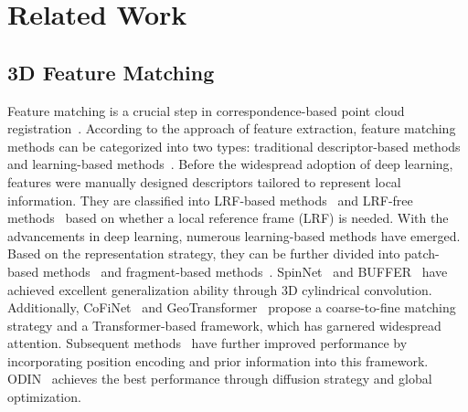 \section{Related Work}
\subsection{3D Feature Matching}
Feature matching is a crucial step in 
correspondence-based point cloud registration~\cite{FPFH,zeng20173dmatch,ao2021spinnet,huang2021predator,yu2021cofinet,qin2022geometric,yu2023peal}. 
According to the approach of feature extraction, feature matching methods 
can be categorized into two types: traditional descriptor-based methods~\cite{PFH, FPFH, salti2014shot} and 
learning-based methods~\cite{ao2021spinnet,huang2021predator,yu2021cofinet,qin2022geometric,yu2023peal}. 
Before the widespread adoption of deep learning, features were manually designed descriptors tailored to represent local information. 
They are classified into LRF-based methods~\cite{guo2013rotational, salti2014shot} and LRF-free methods~\cite{PFH, FPFH} 
based on whether a local reference frame (LRF) is needed. With the advancements in deep learning, 
numerous learning-based methods have emerged. Based on the representation strategy, 
they can be further divided into patch-based methods~\cite{gojcic2019perfect,ao2021spinnet,zhao2023spherenet} 
and fragment-based methods~\cite{choy2019fully,huang2021predator,yu2021cofinet,gath1989unsupervised}. 
SpinNet~\cite{ao2021spinnet} and BUFFER~\cite{ao2023buffer} have achieved excellent generalization ability through 3D cylindrical convolution. Additionally, CoFiNet~\cite{yu2021cofinet} and GeoTransformer~\cite{qin2022geometric} propose a coarse-to-fine matching strategy and a Transformer-based framework, which has garnered widespread attention. Subsequent methods~\cite{yang2022one, yu2023rotation, yu2023peal, jin2024multiway} have further 
improved performance by incorporating position encoding and prior information into this framework.
ODIN~\cite{jin2024multiway} achieves the best performance through diffusion strategy and global optimization.

